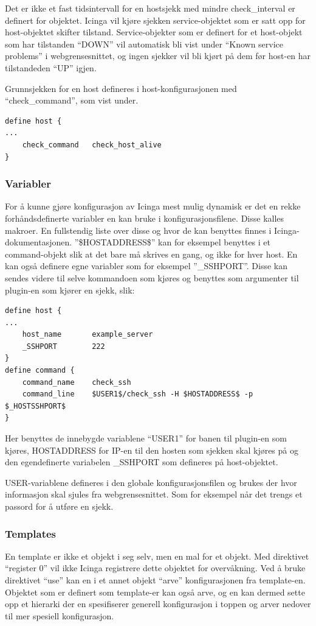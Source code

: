 Det er ikke et fast tidsintervall for en hostsjekk med mindre check\_interval er definert for objektet. Icinga vil kjøre sjekken service-objektet som er satt opp for host-objektet skifter tilstand. Service-objekter som er definert for et host-objekt som har tilstanden ``DOWN'' vil automatisk bli vist under ``Known service problems'' i webgrensesnittet, og ingen sjekker vil bli kjørt på dem før host-en har tilstandeden ``UP'' igjen.

Grunnsjekken for en host defineres i host-konfigurasjonen med ``check\_command'', som vist under.
\begin{lstlisting}[style=example]
define host {
...
    check_command	check_host_alive
}
\end{lstlisting}

\subsubsection{Variabler}
For å kunne gjøre konfigurasjon av Icinga mest mulig dynamisk er det en rekke forhåndsdefinerte variabler en kan bruke i konfigurasjonsfilene. Disse kalles makroer. En fullstendig liste over disse og hvor de kan benyttes finnes i Icinga-dokumentasjonen\cite{icingamacro}. ''\$HOSTADDRESS\$'' kan for eksempel benyttes i et command-objekt slik at det bare må skrives en gang, og ikke for hver host. En kan også definere egne variabler som for eksempel ''\_SSHPORT''. Disse kan sendes videre til selve kommandoen som kjøres og benyttes som argumenter til plugin-en som kjører en sjekk, slik:
\begin{lstlisting}[style=example]
define host {
...
    host_name		example_server
    _SSHPORT		222
}
define command {
    command_name	check_ssh
    command_line	$USER1$/check_ssh -H $HOSTADDRESS$ -p $_HOSTSSHPORT$
}
\end{lstlisting}

Her benyttes de innebygde variablene ``USER1'' for banen til plugin-en som kjøres, HOSTADDRESS for IP-en til den hosten som sjekken skal kjøres på og den egendefinerte variabelen \_SSHPORT som defineres på host-objektet.

USER-variablene defineres i den globale konfigurasjonsfilen og brukes der hvor informasjon skal sjules fra webgrensesnittet. Som for eksempel når det trengs et passord for å utføre en sjekk.

\subsubsection{Templates}
En template er ikke et objekt i seg selv, men en mal for et objekt. Med direktivet ``register 0'' vil ikke Icinga registrere dette objektet for overvåkning. Ved å bruke direktivet ``use'' kan en i et annet objekt ``arve'' konfigurasjonen fra template-en. Objektet som er definert som template-er kan også arve, og en kan dermed sette opp et hierarki der en spesifiserer generell konfigurasjon i toppen og arver nedover til mer spesiell konfigurasjon. 

